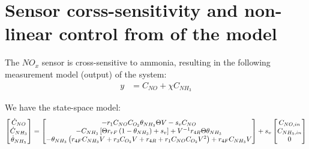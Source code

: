 \section{Sensor corss-sensitivity and non-linear control from of the model}

The $NO_x$ sensor is cross-sensitive to ammonia, resulting in the following
measurement model (output) of the system:
\begin{align*}
    y &= C_{NO} + \chi C_{NH_3}
\end{align*}

We have the state-space model:
\begin{align*}
    \begin{bmatrix} \dot C_{NO} \\
        \dot C_{NH_3}\\
        \dot \theta_{NH_3}\\
         \end{bmatrix} =
    \begin{bmatrix} 
        -r_1 C_{NO} C_{O_2} \theta_{NH_3} \Theta V
        -s_v C_{NO}\\
        -C_{NH_3} \left[ \Theta r_{rF} \left( 1 - \theta_{NH_3} \right) + s_v \right] + V^{-1} r_{4R} \Theta \theta_{NH_3}\\
        -\theta_{NH_3} \left( r_{4F}C_{NH_3} V + r_3 C_{O_2}V + r_{4R} + r_1 C_{NO} C_{O_2} V^2  \right) + r_{4F} C_{NH_3} V
     \end{bmatrix}
    + s_v \begin{bmatrix} C_{NO, in} \\ C_{NH_3, in} \\ 0 \end{bmatrix}
\end{align*}
